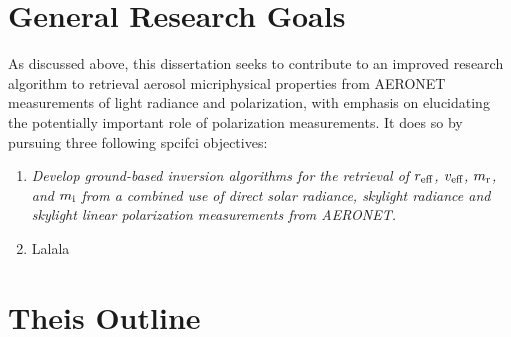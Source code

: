\section{General Research Goals}

As discussed above, this dissertation seeks to contribute to an improved
research algorithm to retrieval aerosol micriphysical properties from AERONET
measurements of light radiance and polarization, with emphasis on elucidating
the potentially important role of polarization measurements. It does so by 
pursuing three following spcifci objectives:

\begin{enumerate}
\item \textit{Develop ground-based inversion algorithms for the retrieval of $r_\text{eff}$,
$v_\text{eff}$, $m_\text{r}$, and $m_\text{i}$ from a combined use of direct solar radiance, 
skylight radiance and skylight linear polarization measurements from AERONET.}
\item Lalala
\end{enumerate}

\section{Theis Outline}
